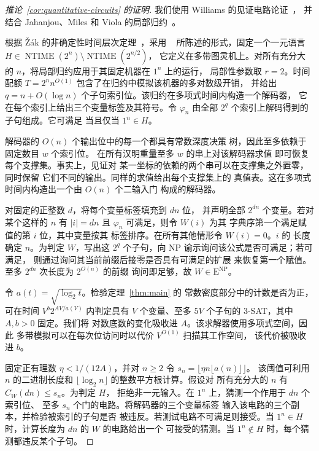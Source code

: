\begin{proof}[推论~\ref{cor:quantitative-circuits} 的证明]
我们使用 Williams 的见证电路论证~\cite[定理~6.1]{Wil13}，
并结合 Jahanjou、Miles 和
Viola 的局部归约~\cite[定理~1 和第~6 节]{JMV13}。

根据 \v{Z}\'ak 的非确定性时间层次定理~\cite{Zak83}，采用
~\cite[完整版中的定理~2.1]{Wil13} 所陈述的形式，固定一个一元语言
$H\in\operatorname{NTIME}(2^n)\setminus\operatorname{NTIME}(2^{n/2})$，
它定义在多带图灵机上。对所有充分大的 $n$，将局部归约应用于其固定机器在 $1^n$ 上的运行，
局部性参数取 $r=2$。时间配额
$T=2^n n^{O(1)}$ 包含了在归约中模拟该机器的多对数级开销，
并给出 $q=n+O(\log n)$ 个子句索引位。该归约在多项式时间内构造一个解码器，
它在每个索引上给出三个变量标签及其符号。令 $\varphi_n$
由全部 $2^q$ 个索引上解码得到的子句组成。它可满足
当且仅当 $1^n\in H$。

解码器的 $O(n)$ 个输出位中的每一个都具有常数深度决策
树，因此至多依赖于固定数目 $w$ 个索引位。
在所有汉明重量至多 $w$ 的串上对该解码器求值
即可恢复每个支撑集。事实上，见证对
某一坐标的依赖的两个串可以在支撑集之外置零，同时保留
它们不同的输出。同样的求值给出每个支撑集上的
真值表。这在多项式时间内构造出一个由 $O(n)$ 个二输入门
构成的解码器。

对固定的正整数 $d$，将每个变量标签填充到 $dn$ 位，
并声明全部 $2^{dn}$ 个变量。若对某个这样的 $n$ 有 $|i|=dn$ 且
$\varphi_n$ 可满足，则令 $W(i)$ 为其
字典序第一个满足赋值的第 $i$ 位，其中变量按其
标签排序。在所有其他情形令 $W(i)=0$。$i$ 的
长度确定 $n$。为判定 $W$，写出这 $2^q$ 个子句，向
NP 谕示询问该公式是否可满足；若可满足，
则通过询问其当前前缀后接零是否具有可满足的扩展
来恢复第一个赋值。至多 $2^{dn}$ 次长度为 $2^{O(n)}$ 的前缀
询问即足够，故 $W\in\mathrm E^{\mathrm{NP}}$。

令 $a(t)=\sqrt{\log_2 t}$。检验定理~\ref{thm:main} 的
常数密度部分中的计数是否为正，可在时间
$V^b2^{A V/a(V)}$ 内判定具有 $V$ 个变量、至多 $5V$ 个子句的 $3$-SAT，其中 $A,b>0$ 固定。我们将
对数底数的变化吸收进 $A$。该求解器使用多项式空间，因此
多带模拟可以在每次位访问时以代价 $V^{O(1)}$ 扫描其工作空间，
该代价被吸收进 $b$。

固定正有理数 $\eta<1/(12A)$，并对 $n\ge2$ 令
$s_n=\lfloor\eta n\lfloor a(n)\rfloor\rfloor$。
该阈值可利用 $n$ 的二进制长度和
$\lfloor\log_2 n\rfloor$ 的整数平方根计算。假设对
所有充分大的 $n$ 有 $C_W(dn)\le s_n$。为判定 $H$，
拒绝非一元输入。在 $1^n$ 上，猜测一个作用于 $dn$ 个索引位、
至多 $s_n$ 个门的电路。将解码器的三个变量标签
输入该电路的三个副本，并检验被索引的子句是否
被违反。若测试电路不可满足则接受。当
$1^n\in H$ 时，计算长度为 $dn$ 的 $W$ 的电路给出一个
可接受的猜测。当 $1^n\notin H$ 时，每个猜测都违反某个子句。


\end{proof}
